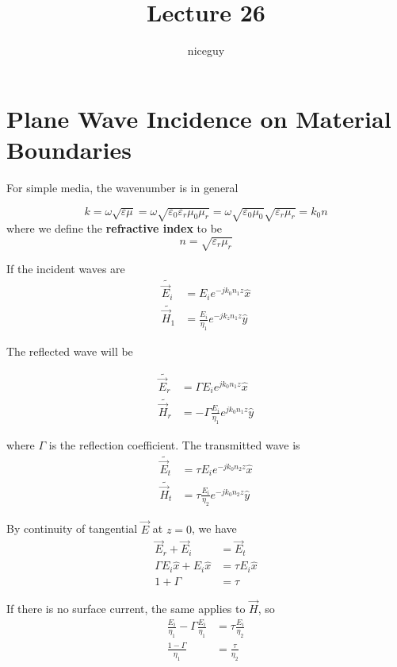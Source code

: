\documentclass[12pt]{article}
\title{Lecture 26}
\author{niceguy}
\begin{document}
\maketitle

\section{Plane Wave Incidence on Material Boundaries}

For simple media, the wavenumber is in general

$$k = \omega\sqrt{\varepsilon\mu} = \omega\sqrt{\varepsilon_0\varepsilon_r\mu_0\mu_r} = \omega\sqrt{\varepsilon_0\mu_0}\sqrt{\varepsilon_r\mu_r} = k_0n$$
where we define the \textbf{refractive index} to be
$$n = \sqrt{\varepsilon_r\mu_r}$$

If the incident waves are
\begin{align*}
    \tilde{\vec E_i} &= E_ie^{-jk_0n_1z} \hat x \\
    \tilde{\vec H_1} &= \frac{E_i}{\eta_1} e^{-jk_zn_1z} \hat y
\end{align*}

The reflected wave will be

\begin{align*}
    \tilde{\vec E_r} &= \Gamma E_i e^{jk_0n_1z} \hat x \\
    \tilde{\vec H_r} &= -\Gamma \frac{E_i}{\eta_1} e^{jk_0n_1z} \hat y
\end{align*}

where $\Gamma$ is the reflection coefficient. The transmitted wave is
\begin{align*}
    \tilde{\vec E_t} &= \tau E_i e^{-jk_0n_2z} \hat x \\
    \tilde{\vec H_t} &= \tau \frac{E_i}{\eta_2} e^{-jk_0n_2z} \hat y
\end{align*}

By continuity of tangential $\vec E$ at $z = 0$, we have
\begin{align*}
    \vec E_r + \vec E_i &= \vec E_t \\
    \Gamma E_i \hat x + E_i \hat x &= \tau E_i \hat x \\
    1 + \Gamma &= \tau
\end{align*}

If there is no surface current, the same applies to $\vec H$, so
\begin{align*}
    \frac{E_i}{\eta_1} - \Gamma \frac{E_i}{\eta_1} &= \tau \frac{E_i}{\eta_2} \\
    \frac{1 - \Gamma}{\eta_1} &= \frac{\tau}{\eta_2}
\end{align*}
\end{document}
